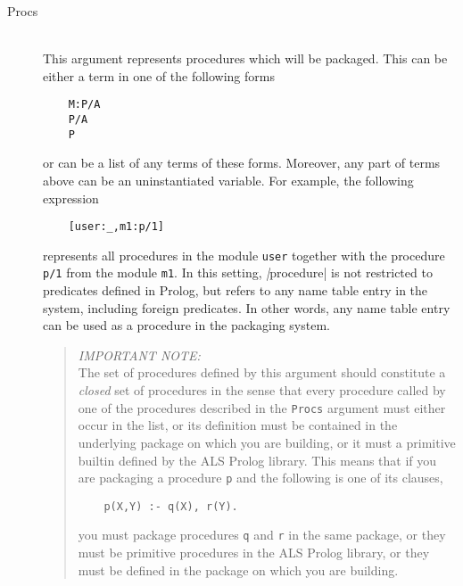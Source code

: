 \begin{description}
\item[Procs] \ \\ 
This argument represents procedures which will be packaged. 
This can be either a term in one of the following forms
\begin{verbatim}
    M:P/A	
    P/A
    P
\end{verbatim}
or can be a list of any terms of these forms.
Moreover, any part of terms above can be an uninstantiated variable.
For example, the following expression
\begin{verbatim}
    [user:_,m1:p/1]
\end{verbatim}
represents all procedures in the module \verb|user| together with the procedure \verb|p/1|
from the module \verb|m1|. 
In this setting,  \emph|procedure| is not restricted to predicates
defined in Prolog, but refers to any name table entry in the system,
including foreign predicates.
In other words, any name table entry can be used as a procedure in the packaging system. 

\begin{quotation}
\emph{IMPORTANT NOTE:}\\
The set of procedures defined by this argument should constitute
a \emph{closed} set of procedures in the sense that every procedure
called by one of the procedures described in the \verb|Procs| argument
must either occur in the list, or its definition must be contained in
the underlying package on which you are building, or it must a primitive
builtin defined by the ALS Prolog library.
This means that if you are 
packaging a procedure \verb|p| and the following is one of its clauses,
\begin{verbatim}
    p(X,Y) :- q(X), r(Y).
\end{verbatim}
you must package procedures \verb|q| and \verb|r| in the same package,
or they must be primitive procedures in the ALS Prolog library, or they
must be defined in the package on which you are building.


\end{quotation}
\end{description}
